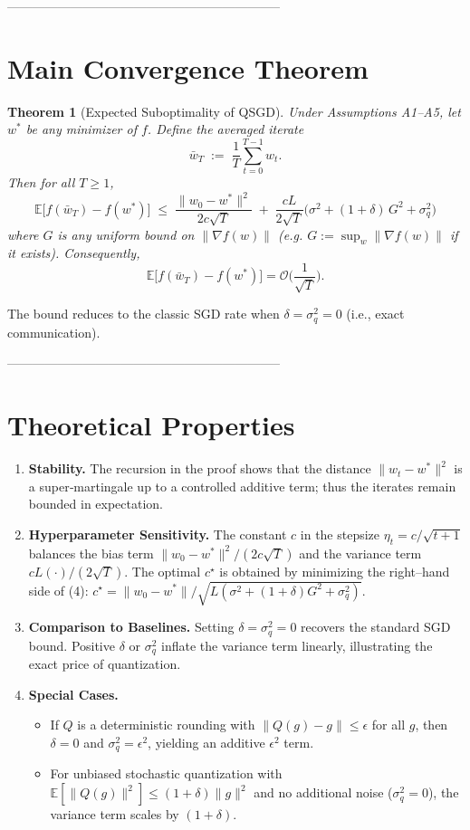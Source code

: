 \documentclass{article}
\newtheorem{theorem}{Theorem}
\newcommand{\E}{\mathbb{E}}
\begin{document}
-----------------------------------------------------------------
\section*{Main Convergence Theorem}
\begin{theorem}[Expected Suboptimality of QSGD]\label{thm:main}
Under Assumptions A1–A5, let $w^{*}$ be any minimizer of $f$. Define the averaged iterate
\[
\bar w_{T}\;:=\;\frac{1}{T}\sum_{t=0}^{T-1}w_{t}.
\]
Then for all $T\ge1$,
\[
\boxed{\E\!\big[f(\bar w_{T})-f(w^{*})\big]\;\le\;
\frac{\|w_{0}-w^{*}\|^{2}}{2c\sqrt{T}}
\;+\;
\frac{cL}{2\sqrt{T}}\Big(\sigma^{2}+ (1+\delta)\,G^{2}+\sigma_{q}^{2}\Big)}\tag{4}
\]
where $G$ is any uniform bound on $\|\nabla f(w)\|$ (e.g. $G:=\sup_{w}\|\nabla f(w)\|$ if it exists). Consequently,
\[
\E\!\big[f(\bar w_{T})-f(w^{*})\big]=\mathcal{O}\!\Big(\frac{1}{\sqrt{T}}\Big).
\]
\end{theorem}
The bound reduces to the classic SGD rate when $\delta=\sigma_{q}^{2}=0$ (i.e., exact communication).

-----------------------------------------------------------------
\section*{Theoretical Properties}
\begin{enumerate}
\item \textbf{Stability.} The recursion in the proof shows that the distance $\|w_{t}-w^{*}\|^{2}$ is a super‑martingale up to a controlled additive term; thus the iterates remain bounded in expectation.
\item \textbf{Hyperparameter Sensitivity.} The constant $c$ in the stepsize $\eta_{t}=c/\sqrt{t+1}$ balances the bias term $\|w_{0}-w^{*}\|^{2}/(2c\sqrt{T})$ and the variance term $cL(\cdot)/(2\sqrt{T})$. The optimal $c^{\star}$ is obtained by minimizing the right–hand side of (4):  
$c^{\star}= \|w_{0}-w^{*}\|/\sqrt{L(\sigma^{2}+(1+\delta)G^{2}+\sigma_{q}^{2})}$.
\item \textbf{Comparison to Baselines.} Setting $\delta=\sigma_{q}^{2}=0$ recovers the standard SGD bound. Positive $\delta$ or $\sigma_{q}^{2}$ inflate the variance term linearly, illustrating the exact price of quantization.
\item \textbf{Special Cases.}  
  \begin{itemize}
    \item If $Q$ is a deterministic rounding with $\|Q(g)-g\|\le \epsilon$ for all $g$, then $\delta=0$ and $\sigma_{q}^{2}=\epsilon^{2}$, yielding an additive $\epsilon^{2}$ term.
    \item For unbiased stochastic quantization with $\E[\|Q(g)\|^{2}]\le (1+\delta)\|g\|^{2}$ and no additional noise ($\sigma_{q}^{2}=0$), the variance term scales by $(1+\delta)$.
  \end{itemize}
\end{enumerate}
\end{document}
